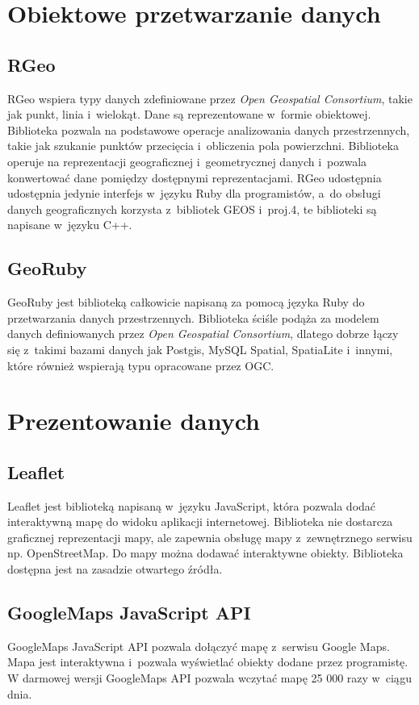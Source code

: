 \documentclass[printmode]{mgr}
\begin{document}
\section{Obiektowe przetwarzanie danych}
\subsection{RGeo}
RGeo wspiera typy danych zdefiniowane przez \textit{Open Geospatial Consortium}, takie jak punkt, linia i~wielokąt. Dane są reprezentowane w~formie obiektowej. Biblioteka pozwala na podstawowe operacje analizowania danych przestrzennych, takie jak szukanie punktów przecięcia i~obliczenia pola powierzchni. Biblioteka operuje na reprezentacji geograficznej i~geometrycznej danych i~pozwala konwertować dane pomiędzy dostępnymi reprezentacjami. RGeo udostępnia udostępnia jedynie interfejs w~języku Ruby dla programistów, a~do obsługi danych geograficznych korzysta z~bibliotek GEOS i~proj.4, te biblioteki są napisane w~języku C++. \cite{doc_rgeo}

\subsection{GeoRuby}
GeoRuby jest biblioteką całkowicie napisaną za pomocą języka Ruby do przetwarzania danych przestrzennych. Biblioteka ściśle podąża za modelem danych definiowanych przez \textit{Open Geospatial Consortium}, dlatego dobrze łączy się z~takimi bazami danych jak Postgis, MySQL Spatial, SpatiaLite i~innymi, które również wspierają typu opracowane przez OGC. \cite{doc_georuby}

\section{Prezentowanie danych}
\label{sec:maps-tools}
\subsection{Leaflet}
Leaflet jest biblioteką napisaną w~języku JavaScript, która pozwala dodać interaktywną mapę do widoku aplikacji internetowej. Biblioteka nie dostarcza graficznej reprezentacji mapy, ale zapewnia obsługę mapy z~zewnętrznego serwisu np. OpenStreetMap. Do mapy można dodawać interaktywne obiekty. Biblioteka dostępna jest na zasadzie otwartego źródła. \cite{doc_leaflet}

\subsection{GoogleMaps JavaScript API}
GoogleMaps JavaScript API pozwala dołączyć mapę z~serwisu Google Maps. Mapa jest interaktywna i~pozwala wyświetlać obiekty dodane przez programistę. W darmowej wersji GoogleMaps API pozwala wczytać mapę 25 000 razy w~ciągu dnia. \cite{doc_google}
\end{document}
